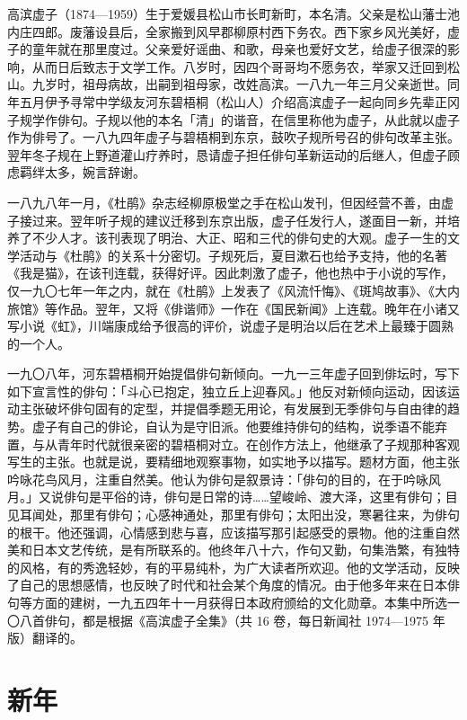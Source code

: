 {\FS
    高滨虚子（1874—1959）生于爱媛县松山市长町新町，本名清。父亲是松山藩士池内庄四郎。废藩设县后，全家搬到风早郡柳原村西下务农。西下家乡风光美好，虚子的童年就在那里度过。父亲爱好谣曲、和歌，母亲也爱好文艺，给虚子很深的影响，从而日后致志于文学工作。八岁时，因四个哥哥均不愿务农，举家又迁回到松山。九岁时，祖母病故，出嗣到祖母家，改姓高滨。一八九一年三月父亲逝世。同年五月伊予寻常中学级友河东碧梧桐（松山人）介绍高滨虚子一起向同乡先辈正冈子规学作俳句。子规以他的本名「清」的谐音，在信里称他为虚子，从此就以虚子作为俳号了。一八九四年虚子与碧梧桐到东京，鼓吹子规所号召的俳句改革主张。翌年冬子规在上野道灌山疗养时，恳请虚子担任俳句革新运动的后继人，但虚子顾虑羁绊太多，婉言辞谢。

    一八九八年一月，《杜鹃》杂志经柳原极堂之手在松山发刊，但因经营不善，由虚子接过来。翌年听子规的建议迁移到东京出版，虚子任发行人，遂面目一新，并培养了不少人才。该刊表现了明治、大正、昭和三代的俳句史的大观。虚子一生的文学活动与《杜鹃》的关系十分密切。子规死后，夏目漱石也给予支持，他的名著《我是猫》，在该刊连载，获得好评。因此刺激了虚子，他也热中于小说的写作，仅一九〇七年一年之内，就在《杜鹃》上发表了《风流忏悔》、《斑鸠故事》、《大内旅馆》等作品。翌年，又将《俳谐师》一作在《国民新闻》上连载。晚年在小诸又写小说《虹》，川端康成给予很高的评价，说虚子是明治以后在艺术上最臻于圆熟的一个人。

    一九〇八年，河东碧梧桐开始提倡俳句新倾向。一九一三年虚子回到俳坛时，写下如下宣言性的俳句：「斗心已抱定，独立丘上迎春风。」他反对新倾向运动，因该运动主张破坏俳句固有的定型，并提倡季题无用论，有发展到无季俳句与自由律的趋势。虚子有自己的俳论，自认为是守旧派。他要维持俳句的结构，说季语不能弃置，与从青年时代就很亲密的碧梧桐对立。在创作方法上，他继承了子规那种客观写生的主张。也就是说，要精细地观察事物，如实地予以描写。题材方面，他主张吟咏花鸟风月，注重自然美。他认为俳句是叙景诗：「俳句的目的，在于吟咏风月。」又说俳句是平俗的诗，俳句是日常的诗……望峻岭、渡大泽，这里有俳句；目见耳闻处，那里有俳句；心感神通处，那里有俳句；太阳出没，寒暑往来，为俳句的根干。他还强调，心情感到悲与喜，应该描写那引起感受的景物。他的注重自然美和日本文艺传统，是有所联系的。他终年八十六，作句又勤，句集浩繁，有独特的风格，有的秀逸轻妙，有的平易纯朴，为广大读者所欢迎。他的文学活动，反映了自己的思想感情，也反映了时代和社会某个角度的情况。由于他多年来在日本俳句等方面的建树，一九五四年十一月获得日本政府颁给的文化勋章。本集中所选一〇八首俳句，都是根据《高滨虚子全集》（共 16 卷，每日新闻社 1974—1975 年版）翻译的。
}

\newpage

\section{\FK 新年}

